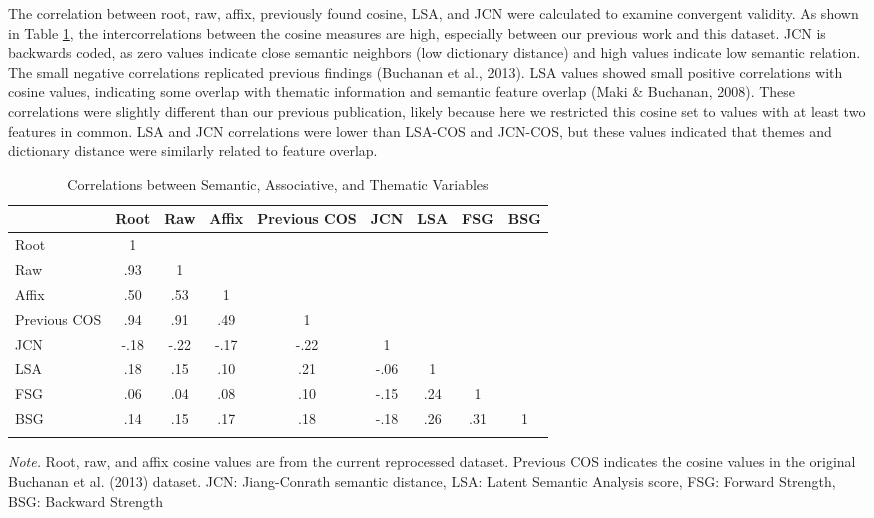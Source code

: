 \documentclass[english,,man]{apa6}
\theoremstyle{definition}
\theoremstyle{definition}
\theoremstyle{definition}
\theoremstyle{remark}
\begin{document}
The correlation between root, raw, affix, previously found cosine, LSA,
and JCN were calculated to examine convergent validity. As shown in
Table \ref{tab:correlation-table}, the intercorrelations between the
cosine measures are high, especially between our previous work and this
dataset. JCN is backwards coded, as zero values indicate close semantic
neighbors (low dictionary distance) and high values indicate low
semantic relation. The small negative correlations replicated previous
findings (Buchanan et al., 2013). LSA values showed small positive
correlations with cosine values, indicating some overlap with thematic
information and semantic feature overlap (Maki \& Buchanan, 2008). These
correlations were slightly different than our previous publication,
likely because here we restricted this cosine set to values with at
least two features in common. LSA and JCN correlations were lower than
LSA-COS and JCN-COS, but these values indicated that themes and
dictionary distance were similarly related to feature overlap.

\begin{table}[tbp]
\begin{center}
\begin{threeparttable}
\caption{\label{tab:correlation-table}Correlations between Semantic, Associative, and Thematic Variables}
\begin{tabular}{lcccccccc}
\toprule
  & Root & Raw & Affix & Previous COS & JCN & LSA & FSG & BSG\\
\midrule
Root & 1 &  &  &  &  &  &  & \\
Raw & .93 & 1 &  &  &  &  &  & \\
Affix & .50 & .53 & 1 &  &  &  &  & \\
Previous COS & .94 & .91 & .49 & 1 &  &  &  & \\
JCN & -.18 & -.22 & -.17 & -.22 & 1 &  &  & \\
LSA & .18 & .15 & .10 & .21 & -.06 & 1 &  & \\
FSG & .06 & .04 & .08 & .10 & -.15 & .24 & 1 & \\
BSG & .14 & .15 & .17 & .18 & -.18 & .26 & .31 & 1\\
\bottomrule
\addlinespace
\end{tabular}
\begin{tablenotes}[para]
\normalsize{\textit{Note.} Root, raw, and affix cosine values are from the current reprocessed dataset. Previous COS indicates the cosine values in the original Buchanan et al. (2013) dataset. JCN: Jiang-Conrath semantic distance, LSA: Latent Semantic Analysis score, FSG: Forward Strength, BSG: Backward Strength}
\end{tablenotes}
\end{threeparttable}
\end{center}
\end{table}
\end{document}
